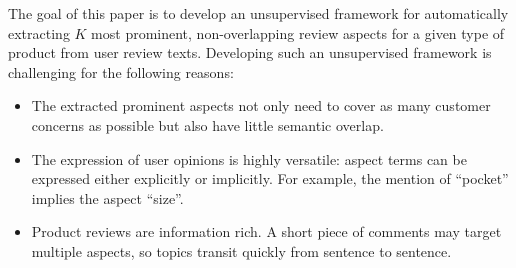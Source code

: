 
%

The goal of this paper is to develop an unsupervised framework 
for automatically extracting $K$ most prominent, non-overlapping 
review aspects for a given type of product from user review texts.  
Developing such an unsupervised framework is challenging for 
the following reasons: 
\begin{itemize}
    \item 
	The extracted prominent aspects not only need to cover as many customer concerns as possible but also have little semantic overlap. 
    \item The expression of user opinions is highly versatile: 
aspect terms can be expressed either explicitly or implicitly. For example,
the mention of ``pocket'' implies the aspect ``size''.
    \item Product reviews are information rich. A short piece of comments 
may target multiple aspects, so topics transit quickly from sentence 
to sentence. 
\end{itemize}

